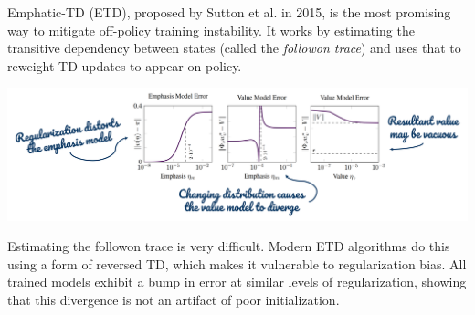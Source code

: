 Emphatic-TD (ETD), proposed by Sutton et al. in 2015, is the most promising way to mitigate off-policy training instability. It works by estimating the transitive dependency between states (called the \emph{followon trace}) and uses that to reweight TD updates to appear on-policy.

\begin{center}
    \includegraphics[scale=0.4]{parts/emphatic/emphatic.png}
\end{center}
Estimating the followon trace is very difficult. Modern ETD algorithms do this using a form of reversed TD, which makes it vulnerable to regularization bias.
All trained models exhibit a bump in error at similar levels of regularization, showing that this divergence is not an artifact of poor initialization.
